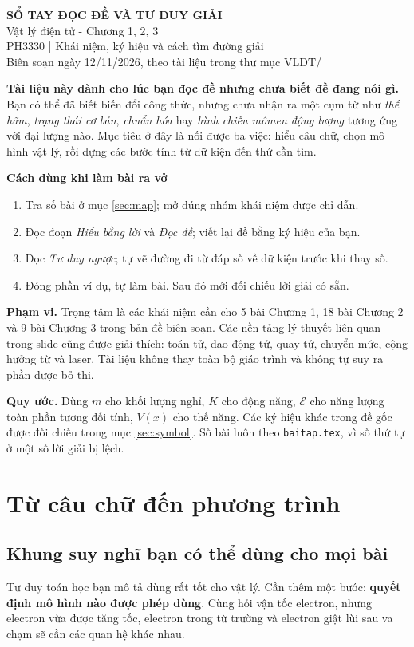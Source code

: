 \documentclass[11pt,a4paper]{article}
\newcommand{\chap}[1]{\par\section{#1}}
\begin{document}
\begin{center}
{\LARGE\bfseries SỔ TAY ĐỌC ĐỀ VÀ TƯ DUY GIẢI}\\[5pt]
{\Large Vật lý điện tử - Chương 1, 2, 3}\\[6pt]
{\normalsize PH3330 | Khái niệm, ký hiệu và cách tìm đường giải}\\[3pt]
{\small Biên soạn ngày 12/11/2026, theo tài liệu trong thư mục VLDT/}
\end{center}

\textbf{Tài liệu này dành cho lúc bạn đọc đề nhưng chưa biết đề đang nói gì.}
Bạn có thể đã biết biến đổi công thức, nhưng chưa nhận ra một cụm từ như
\emph{thế hãm}, \emph{trạng thái cơ bản}, \emph{chuẩn hóa} hay
\emph{hình chiếu mômen động lượng} tương ứng với đại lượng nào.
Mục tiêu ở đây là nối được ba việc: hiểu câu chữ, chọn mô hình vật lý,
rồi dựng các bước tính từ dữ kiện đến thứ cần tìm.

\textbf{Cách dùng khi làm bài ra vở}
\begin{enumerate}
\item Tra số bài ở mục \ref{sec:map}; mở đúng nhóm khái niệm được chỉ dẫn.
\item Đọc đoạn \emph{Hiểu bằng lời} và \emph{Đọc đề}; viết lại đề bằng ký hiệu của bạn.
\item Đọc \emph{Tư duy ngược}; tự vẽ đường đi từ đáp số về dữ kiện trước khi thay số.
\item Đóng phần ví dụ, tự làm bài. Sau đó mới đối chiếu lời giải có sẵn.
\end{enumerate}

\textbf{Phạm vi.} Trọng tâm là các khái niệm cần cho 5 bài Chương 1,
18 bài Chương 2 và 9 bài Chương 3 trong bản đề biên soạn.
Các nền tảng lý thuyết liên quan trong slide cũng được giải thích:
toán tử, dao động tử, quay tử, chuyển mức, cộng hưởng từ và laser.
Tài liệu không thay toàn bộ giáo trình và không tự suy ra phần được bỏ thi.

\textbf{Quy ước.} Dùng $m$ cho khối lượng nghỉ, $K$ cho động năng,
$\mathcal E$ cho năng lượng toàn phần tương đối tính, $V(x)$ cho thế năng.
Các ký hiệu khác trong đề gốc được đối chiếu trong mục \ref{sec:symbol}.
Số bài luôn theo \texttt{baitap.tex}, vì số thứ tự ở một số lời giải bị lệch.

\begingroup
\small
\setlength{\parskip}{0pt}
\tableofcontents
\endgroup
\clearpage

\chap{Từ câu chữ đến phương trình}
\subsection{Khung suy nghĩ bạn có thể dùng cho mọi bài}\label{sec:thinking}
Tư duy toán học bạn mô tả dùng rất tốt cho vật lý. Cần thêm một bước:
\textbf{quyết định mô hình nào được phép dùng}. Cùng hỏi vận tốc electron,
nhưng electron vừa được tăng tốc, electron trong từ trường và electron
giật lùi sau va chạm sẽ cần các quan hệ khác nhau.
\end{document}
